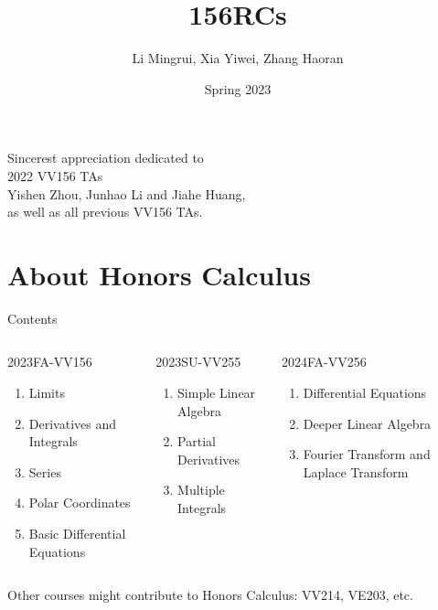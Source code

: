 \documentclass{beamer}
\title{\LARGE 156RCs}
\author{ Li Mingrui, Xia Yiwei, Zhang Haoran}
\date{Spring 2023}
\begin{document}
\maketitle
\begin{frame}
\begin{center}
\Large
    Sincerest appreciation dedicated to \\
    2022 VV156 TAs\\
    Yishen Zhou, Junhao Li and  Jiahe Huang, \\
    as well as all previous VV156 TAs.
    \normalsize
\end{center}
    
\end{frame}
\section{About Honors Calculus}
\begin{frame}{Contents}
    	
\begin{columns}

\begin{column}{.333\linewidth}
\Large 2023FA-VV156
\normalsize
\begin{enumerate}
	\item Limits
	\item Derivatives and Integrals
	\item Series
	\item Polar Coordinates
	\item Basic Differential Equations
\end{enumerate}
\end{column}

\begin{column}{.333\linewidth}
\Large 2023SU-VV255
\normalsize
\begin{enumerate}
	\item Simple Linear Algebra
	\item Partial Derivatives
	\item Multiple Integrals
\end{enumerate}
\end{column}

\begin{column}{.333\linewidth}
\Large 2024FA-VV256
\normalsize
\begin{enumerate}
	\item Differential Equations
	\item Deeper Linear Algebra
	\item Fourier Transform and Laplace Transform

\end{enumerate}
\end{column}

\end{columns}
\vspace {1cm}
Other courses might contribute to Honors Calculus:
VV214, VE203, etc.
	
\end{frame}
\end{document}
